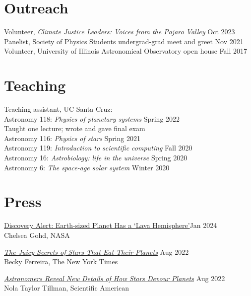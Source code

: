 \documentclass[12pt]{article}
\begin{document}
\section*{Outreach}
Volunteer, \textit{Climate Justice Leaders: Voices from the Pajaro Valley} \hfill Oct 2023\\
Panelist, Society of Physics Students undergrad-grad meet and greet \hfill Nov 2021\\
Volunteer, University of Illinois Astronomical Observatory open house \hfill Fall 2017

\section*{Teaching}
Teaching assistant, UC Santa Cruz:\\
Astronomy 118: \textit{Physics of planetary systems} \hfill Spring 2022\\
{\setlength\parindent{1em}\indent Taught one lecture; wrote and gave final exam}\\
Astronomy 116: \textit{Physics of stars} \hfill Spring 2021\\
Astronomy 119: \textit{Introduction to scientific computing} \hfill Fall 2020\\
Astronomy \phantom{1}16: \textit{Astrobiology: life in the universe} \hfill Spring 2020\\
Astronomy \phantom{11}6: \textit{The space-age solar system} \hfill Winter 2020

\ifdefined\withpress{}
\section*{Press}
\href{https://science.nasa.gov/universe/exoplanets/discovery-alert-earth-sized-planet-has-a-lava-hemisphere/}{Discovery Alert: Earth-sized Planet Has a ‘Lava Hemisphere’}\hfill Jan 2024\\
Chelsea Gohd, NASA

\href{https://www.nytimes.com/2022/08/19/science/stars-planets-engulfment.html}{\textit{The Juicy Secrets of Stars That Eat Their Planets}} \hfill Aug 2022\\
Becky Ferreira, The New York Times

\href{https://www.scientificamerican.com/article/astronomers-reveal-new-details-of-how-stars-devour-planets/}{\textit{Astronomers Reveal New Details of How Stars Devour Planets}} \hfill Aug 2022\\
Nola Taylor Tillman, Scientific American
\end{document}
